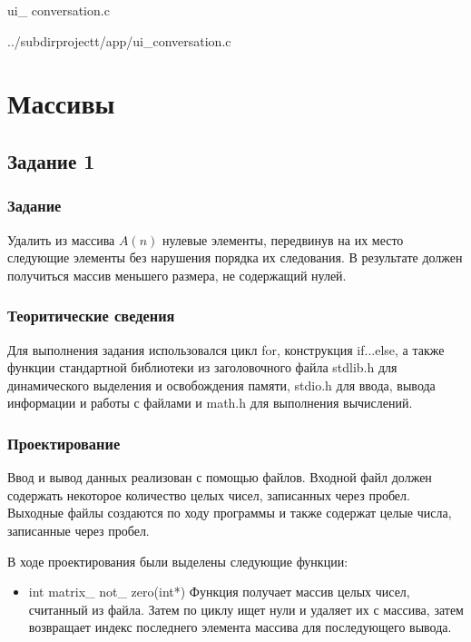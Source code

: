 \documentclass[12pt,a4paper]{report}
\begin{document}
ui\_ conversation.c

{../subdirprojectt/app/ui_conversation.c}

\chapter{Массивы}
\section{Задание 1}
\subsection{Задание}

Удалить из массива $A(n)$ нулевые элементы, передвинув на их место следующие элементы без нарушения порядка их следования. В результате должен получиться массив меньшего размера, не содержащий нулей.

\subsection{Теоритические сведения}

Для выполнения задания использовался цикл for, конструкция if...else, а также функции стандартной библиотеки из заголовочного файла stdlib.h для динамического выделения и освобождения памяти, stdio.h для ввода, вывода информации и работы с файлами и math.h для выполнения вычислений.

\subsection{Проектирование}

Ввод и вывод данных реализован с помощью файлов. Входной файл должен содержать некоторое количество целых чисел, записанных через пробел. Выходные файлы создаются по ходу программы и также содержат целые числа, записанные через пробел.
 
В ходе проектирования были выделены следующие функции:

\begin{itemize}
 	
 	\item int matrix\_ not\_ zero(int*)
 	Функция получает массив целых чисел, считанный из файла. Затем по циклу ищет нули и удаляет их с массива, затем возвращает индекс последнего элемента массива для последующего вывода.
 	
\end{itemize}
	
\end{document}
